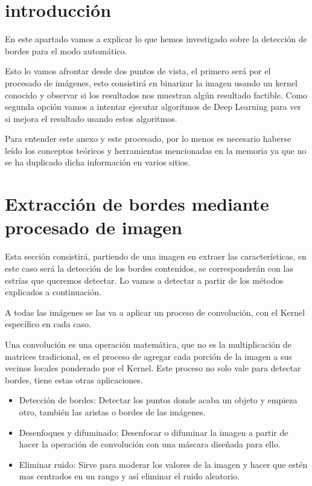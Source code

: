 
\section{introducción}
En este apartado vamos a explicar lo que hemos investigado sobre la detección de bordes para el modo automático.

Esto lo vamos afrontar desde dos puntos de vista, el primero será por el procesado de imágenes, esto consistirá en binarizar la imagen usando un kernel conocido y observar si los resultados nos muestran algún resultado factible.
Como segunda opción vamos a intentar ejecutar algoritmos de Deep Learning para ver si mejora el resultado usando estos algoritmos.

Para entender este anexo y este procesado, por lo menos es necesario haberse leído los conceptos teóricos y herramientas mencionadas en la memoria ya que no se ha duplicado dicha información en varios sitios.

\section{Extracción de bordes mediante procesado de imagen}
Esta sección consistirá, partiendo de una imagen en extraer las características, en este caso será la detección de los bordes contenidos, se corresponderán con las estrías que queremos detectar. Lo vamos a detectar a partir de los métodos explicados a continuación. 

A todas las imágenes se las va a aplicar un proceso de convolución, con el Kernel \cite{wiki:kernels} específico en cada caso.

Una convolución es una operación matemática, que no es la multiplicación de matrices tradicional, es el proceso de agregar cada porción de la imagen a sus vecinos locales ponderado por el Kernel. 
Este proceso no solo vale para detectar bordes, tiene estas otras aplicaciones.
\begin{itemize}
\item Detección de bordes: Detectar los puntos donde acaba un objeto y empieza otro, también las aristas o bordes de las imágenes.
\item Desenfoques y difuminado: Desenfocar o difuminar la imagen a partir de hacer la operación de convolución con una máscara diseñada para ello.
\item Eliminar ruido: Sirve para moderar los valores de la imagen  y hacer que estén mas centrados en un rango y así eliminar el ruido aleatorio. 
\end{itemize}

